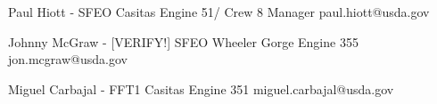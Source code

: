 
Paul Hiott - SFEO Casitas Engine 51/ Crew 8 Manager
paul.hiott@usda.gov

Johnny McGraw - [VERIFY!] SFEO Wheeler Gorge Engine 355
jon.mcgraw@usda.gov

Miguel Carbajal - FFT1 Casitas Engine 351
miguel.carbajal@usda.gov